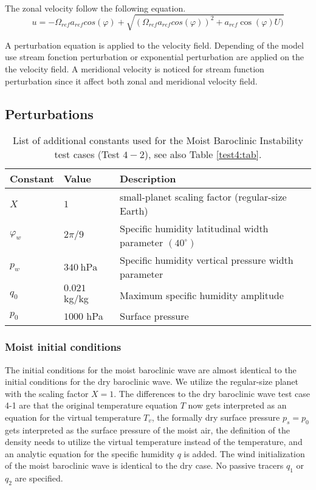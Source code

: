 \documentclass{article}
\begin{document}
\clearpage


~\\ The zonal velocity follow the following equation.  
\begin{equation}
 u=-\Omega_{ref} a_{ref} cos(\varphi)+\sqrt{(\Omega_{ref} a_{ref} cos(\varphi))^2+ a_{ref} \cos(\varphi)U)}
\end{equation}

A perturbation equation is applied to the velocity field. Depending of the model use stream fonction perturbation or exponential perturbation are applied on the the velocity field. A meridional velocity is noticed for stream function perturbation since it affect both zonal and meridional velocity field.





 
\subsection{Perturbations}

\begin{table}[h]

\caption{List of additional constants used for the Moist Baroclinic Instability test cases (Test $4-2$), see also Table \ref{test4:tab}.}
\label{test42:tab}
\begin{tabular*}{\textwidth}{@{\extracolsep{\fill}}lll}
\hline Constant & Value & Description \\
\hline 
$X$ & $1$ & small-planet scaling factor (regular-size Earth)\\
$\varphi_w$ & $2 \pi / 9$ & Specific humidity latitudinal width parameter $(40^\circ)$\\
$p_w$ & $340\ \mbox{hPa}$ & Specific humidity vertical pressure width parameter \\
$q_0$ & $0.021$ kg/kg& Maximum specific humidity amplitude \\
$p_0$ & $1000$ hPa& Surface pressure \\
\hline 
\end{tabular*}

\end{table}

\subsubsection*{Moist initial conditions}
The initial conditions for the moist baroclinic wave are almost identical to the initial conditions for the dry baroclinic wave. We utilize the regular-size planet with the scaling factor $X=1$. The differences to the dry baroclinic wave test case 4-1 are that the original temperature equation $T$ now gets interpreted as an equation for the virtual temperature $T_v$, the formally dry surface pressure $p_s = p_0$ gets interpreted as the surface pressure of the moist air, the definition of the density needs to utilize the virtual temperature instead of the temperature, and an analytic equation for the specific humidity $q$ is added. The wind initialization of the moist baroclinic wave is identical to the dry case. No passive tracers $q_1$  or $q_2$ are specified.
\end{document}

